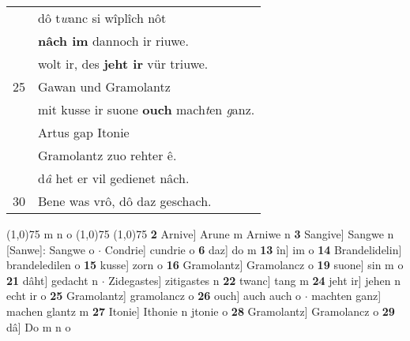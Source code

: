 \documentclass[8pt,a4paper,notitlepage]{article}
\begin{document}
\begin{table}[ht]
\begin{minipage}[t]{0.5\linewidth}
\begin{tabular}{rl}
 & dô t\textit{w}anc si wîplîch nôt\\ 
 & \textbf{nâch im} dannoch ir riuwe.\\ 
 & wolt ir, des \textbf{jeht ir} vür triuwe.\\ 
25 & Gawan und Gramolantz\\ 
 & mit kusse ir suone \textbf{ouch} mach\textit{t}en \textit{g}anz.\\ 
 & Artus gap Itonie\\ 
 & Gramolantz zuo rehter ê.\\ 
 & d\textit{â} het er vil gedienet nâch.\\ 
30 & Bene was vrô, dô daz geschach.\\ 
\end{tabular}
\scriptsize
\line(1,0){75} \newline
m n o \newline
\line(1,0){75} \newline
\newline
\line(1,0){75} \newline
\textbf{2} Arnive] Arune m Arniwe n \textbf{3} Sangive] Sangwe n [Sanwe]: Sangwe o  $\cdot$ Condrie] cundrie o \textbf{6} daz] do m \textbf{13} în] im o \textbf{14} Brandelidelin] brandeledilen o \textbf{15} kusse] zorn o \textbf{16} Gramolantz] Gramolancz o \textbf{19} suone] sin m o \textbf{21} dâht] gedacht n  $\cdot$ Zidegastes] zitigastes n \textbf{22} twanc] tang m \textbf{24} jeht ir] jehen n echt ir o \textbf{25} Gramolantz] gramolancz o \textbf{26} ouch] auch auch o  $\cdot$ machten ganz] machen glantz m \textbf{27} Itonie] Ithonie n jtonie o \textbf{28} Gramolantz] Gramolancz o \textbf{29} dâ] Do m n o \newline
\end{minipage}
\end{table}
\newpage
\end{document}
